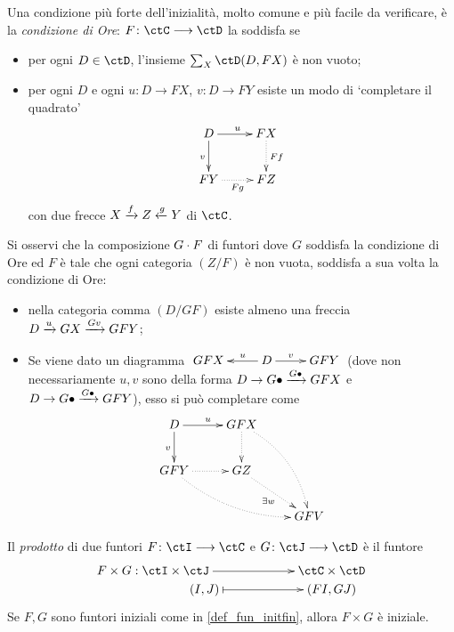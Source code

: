\begin{remark}\label{condizione_ore}
 Una condizione più forte dell'inizialità, molto comune e più facile da verificare, è la \emph{condizione di Ore}: \(F \colon \ctC\fun\ctD\) la soddisfa se
 \begin{itemize}
  \item per ogni \(D\in\ctD\), l'insieme \(\sum_X\Hom{\ctD}(D,FX)\) è non vuoto;
  \item per ogni \(D\) e ogni \(u \colon D\to FX\), \(v \colon D\to FY\) esiste un modo di `completare il quadrato'
        \[\xymatrix{
          D\ar[r]^u\ar[d]_v & FX \ar@{.>}[d]^{Ff}\\
          FY \ar@{.>}[r]_{Fg} & FZ
         }\]
        con due frecce \(X \xrightarrow{f}Z \xleftarrow{g} Y\) di \(\ctC\).
 \end{itemize}
\end{remark}
Si osservi che la composizione \(G\cdot F\) di funtori dove \(G\) soddisfa la condizione di Ore ed \(F\) è tale che ogni categoria \((Z/F)\) è non vuota, soddisfa a sua volta la condizione di Ore:
\begin{itemize}
 \item nella categoria comma \((D/GF)\) esiste almeno una freccia \(D \xrightarrow{u} GX \xrightarrow{Gv} GFY\);
 \item Se viene dato un diagramma \(\xymatrix{GFX & \ar[l]_-u D\ar[r]^-v & GFY}\) (dove non necessariamente \(u,v\) sono della forma \(D\to G\bullet\xrightarrow{G\bullet}GFX\) e \(D\to G\bullet\xrightarrow{G\bullet}GFY\)), esso si può completare come
       \[\xymatrix{
        D \ar[r]^u\ar[d]_v& GFX\ar@{.>}[d]\ar@{.>}@/^1pc/[ddr]\\
        GFY \ar@{.>}[r]\ar@{.>}@/_1pc/[drr] & GZ\ar@{.>}[dr]_{\exists w} \\
        && GFV
        }\]
\end{itemize}
\begin{theorem}\label{prod_inizi_iniziale}
 Il \emph{prodotto} di due funtori \(F \colon \ctI\fun\ctC\) e	\(G \colon \ctJ\fun\ctD\) è il funtore
 \[\xymatrix@R=0cm{
  **[l] F\times G : 	\ctI\times\ctJ \ar[r] & \ctC\times\ctD \\
  (I,J) \ar@{|->}[r] & (FI,GJ)
  }\]
 Se \(F,G\) sono funtori iniziali come in \ref{def_fun_initfin}, allora \(F\times G\) è iniziale.
\end{theorem}
